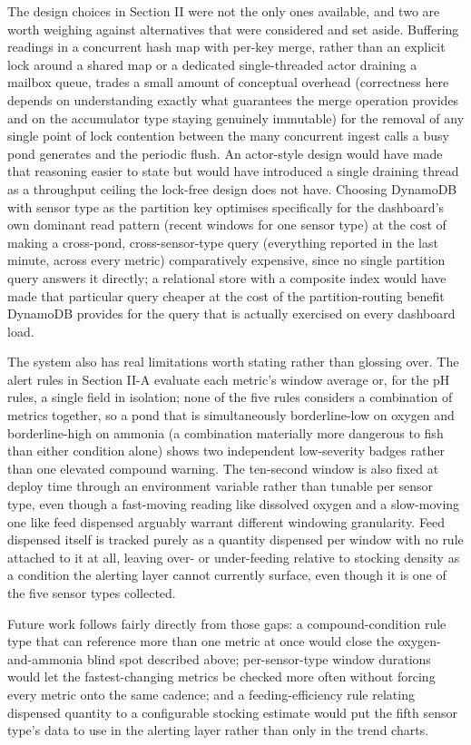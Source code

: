\documentclass[conference]{IEEEtran}
\begin{document}
The design choices in Section II were not the only ones available, and two are worth weighing against alternatives that were considered and set aside. Buffering readings in a concurrent hash map with per-key merge, rather than an explicit lock around a shared map or a dedicated single-threaded actor draining a mailbox queue, trades a small amount of conceptual overhead (correctness here depends on understanding exactly what guarantees the merge operation provides and on the accumulator type staying genuinely immutable) for the removal of any single point of lock contention between the many concurrent ingest calls a busy pond generates and the periodic flush. An actor-style design would have made that reasoning easier to state but would have introduced a single draining thread as a throughput ceiling the lock-free design does not have. Choosing DynamoDB with sensor type as the partition key optimises specifically for the dashboard's own dominant read pattern (recent windows for one sensor type) at the cost of making a cross-pond, cross-sensor-type query (everything reported in the last minute, across every metric) comparatively expensive, since no single partition query answers it directly; a relational store with a composite index would have made that particular query cheaper at the cost of the partition-routing benefit DynamoDB provides for the query that is actually exercised on every dashboard load.

The system also has real limitations worth stating rather than glossing over. The alert rules in Section II-A evaluate each metric's window average or, for the pH rules, a single field in isolation; none of the five rules considers a combination of metrics together, so a pond that is simultaneously borderline-low on oxygen and borderline-high on ammonia (a combination materially more dangerous to fish than either condition alone) shows two independent low-severity badges rather than one elevated compound warning. The ten-second window is also fixed at deploy time through an environment variable rather than tunable per sensor type, even though a fast-moving reading like dissolved oxygen and a slow-moving one like feed dispensed arguably warrant different windowing granularity. Feed dispensed itself is tracked purely as a quantity dispensed per window with no rule attached to it at all, leaving over- or under-feeding relative to stocking density as a condition the alerting layer cannot currently surface, even though it is one of the five sensor types collected.

Future work follows fairly directly from those gaps: a compound-condition rule type that can reference more than one metric at once would close the oxygen-and-ammonia blind spot described above; per-sensor-type window durations would let the fastest-changing metrics be checked more often without forcing every metric onto the same cadence; and a feeding-efficiency rule relating dispensed quantity to a configurable stocking estimate would put the fifth sensor type's data to use in the alerting layer rather than only in the trend charts.
\end{document}
